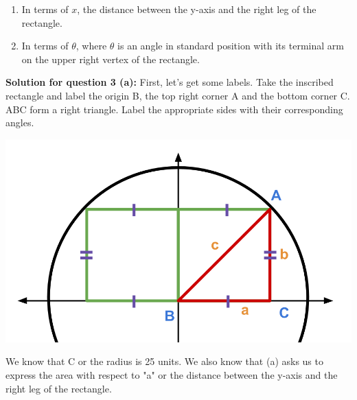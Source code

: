 \documentclass[12pt]{book}
\begin{document}
\begin{enumerate}
\begin{enumerate}
\item In terms of $x$, the distance between the y-axis and the right leg of the rectangle. 
\item In terms of $\theta$, where $\theta$ is an angle in standard position with its terminal arm on the upper right vertex of the rectangle.
\end{enumerate}




\vspace{0.5cm}
\textbf{Solution for question 3 (a):}
\vspace{0.3cm}
First, let's get some labels. Take the inscribed rectangle and 
label the origin B, the top right corner A and the bottom corner C.
ABC form a right triangle. Label the appropriate sides 
with their corresponding angles.

\begin{center}
    \includegraphics[scale = 0.25]{A3-3 Diagram.png}
\end{center}

\vspace{0.3cm}
We know that C or the radius is 25 units. We also know that (a) 
asks us to express the area with respect to "a" or the distance 
between the y-axis and the right leg of the rectangle.


\end{enumerate}
\end{document}
